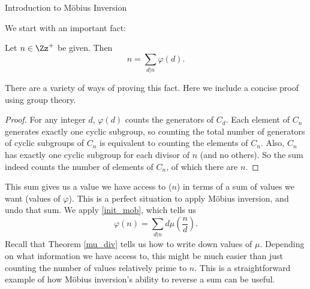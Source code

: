 \documentclass[12pt]{pom_thesis}
\begin{document}
\begin{chapter}{Introduction to M\"obius Inversion}
\begin{examp}
We start with an important fact:
\begin{thm}[Gauss]\label{gauss}
Let $n \in \Zz^+$ be given. Then 
\[
n = \sum_{d|n}\varphi(d).
\]
\end{thm}
There are a variety of ways of proving this fact. Here we include a concise proof using group theory.
\begin{proof}
For any integer $d$, $\varphi(d)$ counts the generators of $C_d$. Each element of $C_n$ generates exactly one cyclic subgroup, so counting the total number of generators of cyclic subgroups of $C_n$ is equivalent to counting the elements of $C_n$. Also, $C_n$ has exactly one cyclic subgroup for each divisor of $n$ (and no others). So the sum indeed counts the number of elements of $C_n$, of which there are $n$.
\end{proof}
This sum gives us a value we have access to ($n$) in terms of a sum of values we want (values of $\varphi$). This is a perfect situation to apply M\"obius inversion, and undo that sum. We apply \eqref{init_mob}, which tells us
\[
\varphi(n) = \sum_{d|n} d\mu\left(\frac nd\right).
\]
Recall that Theorem \ref{mu_div} tells us how to write down values of $\mu$. Depending on what information we have access to, this might be much easier than just counting the number of values relatively prime to $n$. This is a straightforward example of how M\"obius inversion's ability to reverse a sum can be useful.
\end{examp}
\end{chapter}
\end{document}
